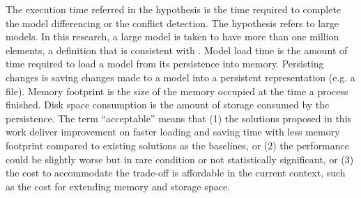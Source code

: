 
The execution time referred in the hypothesis is the time required to complete the model differencing or the conflict detection. The hypothesis refers to large models. In this research, a large model is taken to have more than one million elements, a definition that is consistent with \cite{daniel2016neoemf,DBLP:conf/models/Espinazo-PaganCM11}. Model load time is the amount of time required to load a model from its persistence into memory. Persisting changes is saving changes made to a model into a persistent representation (e.g. a file). Memory footprint is the size of the memory occupied  at the time a process finished. Disk space consumption is the amount of storage consumed by the persistence. The term ``acceptable'' means that (1) the solutions proposed in this work deliver improvement on faster loading and saving time with less memory footprint compared to existing solutions as the baselines, or (2) the performance could be slightly worse but in rare condition or not statistically significant, or (3) the cost to accommodate the trade-off is affordable in the current context, such as the cost for extending memory and storage space.

